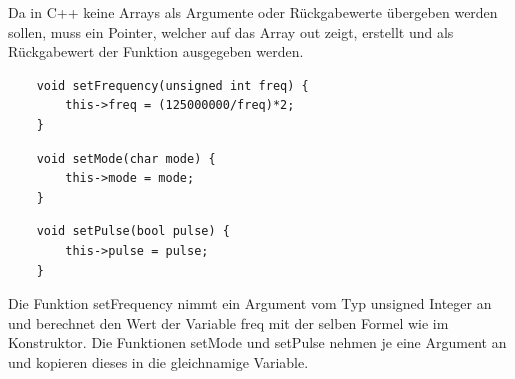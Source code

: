 \documentclass[12pt]{article}
\begin{document}
Da in C++ keine Arrays als Argumente oder Rückgabewerte übergeben werden sollen, muss ein Pointer, welcher auf das Array out zeigt, erstellt und als Rückgabewert der Funktion ausgegeben werden.\\
\begin{verbatim}
    void setFrequency(unsigned int freq) {
        this->freq = (125000000/freq)*2;
    }
\end{verbatim}
\begin{verbatim}
    void setMode(char mode) {
        this->mode = mode;
    }
\end{verbatim}
\begin{verbatim}
    void setPulse(bool pulse) {
        this->pulse = pulse;
    }
\end{verbatim}
Die Funktion setFrequency nimmt ein Argument vom Typ unsigned Integer an und berechnet den Wert der Variable freq mit der selben Formel wie im Konstruktor.
Die Funktionen setMode und setPulse nehmen je eine Argument an und kopieren dieses in die gleichnamige Variable.\\
\end{document}
